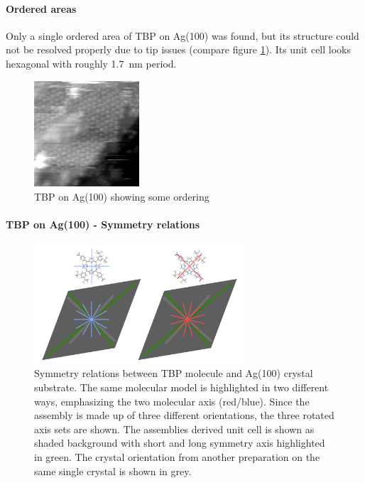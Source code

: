 \paragraph{Ordered areas}
Only a single ordered area of TBP on Ag(100) was found, but its structure could not be resolved properly due to tip issues (compare figure \ref{fig:hex-TBP-Ag100}). Its unit cell looks hexagonal with roughly \SI{1.7} {\nano \meter} period. 

\begin{figure}[h!]
	\centering
	\includegraphics[width=0.35\textwidth]{./images/F151007-112800}
	\caption{TBP on Ag(100) showing some ordering}
	\label{fig:hex-TBP-Ag100}
\end{figure}
\paragraph{TBP on Ag(100) - Symmetry relations}
	\begin{figure}[h!]
		\centering
		\includegraphics[width=0.7\textwidth]{./images/F160429-185245-R-model-2-crystal-orientation.png}
		\caption{Symmetry relations between TBP molecule and Ag(100) crystal substrate. The same molecular model is highlighted in two different ways, emphasizing the two molecular axis (red/blue). Since the assembly is made up of three different orientations, the three rotated axis sets are shown. The assemblies derived unit cell is shown as shaded background with short and long symmetry axis highlighted in green. The crystal orientation from another preparation on the same single crystal is shown in grey.}
		\label{F160429-185245-R-model-2-crystal-orientation.png}			
	\end{figure}

